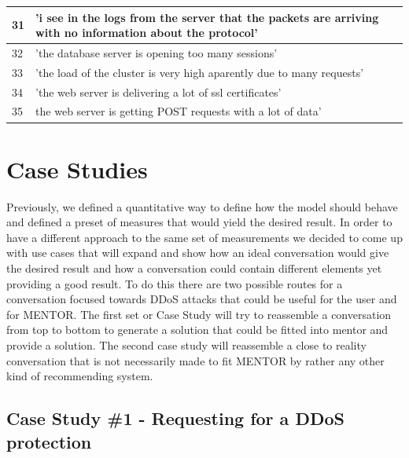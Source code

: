\begin{table}
{\begin{tabular}{|l|l|}
\hline
31     & 'i see in the logs from the server that the packets are arriving with no information about the protocol'  \\ 
\hline
32     & 'the database server is opening too many sessions'                                                        \\ 
\hline
33     & 'the load of the cluster is very high aparently due to many requests'                                     \\ 
\hline
34     & 'the web server is delivering a lot of ssl certificates'                                                  \\ 
\hline
35     & the web server is getting POST requests with a lot of data'                                               \\
\hline
\end{tabular}
}
\end{table}

\section{Case Studies}

Previously, we defined a quantitative way to define how the model should behave and defined a preset of measures that would yield the desired result. In order to have a different approach to the same set of measurements we decided to come up with use cases that will expand and show how an ideal conversation would give the desired result and how a conversation could contain different elements yet providing a good result. To do this there are two possible routes for a conversation focused towards DDoS attacks that could be useful for the user and for MENTOR. The first set or Case Study will try to reassemble a conversation from top to bottom to generate a solution that could be fitted into mentor and provide a solution. The second case study will reassemble a close to reality conversation that is not necessarily made to fit MENTOR by rather any other kind of recommending system.

\subsection{Case Study \#1 - Requesting for a DDoS protection}

